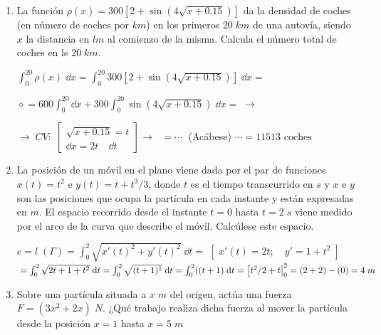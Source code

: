 \begin{enumerate}[{A6} 1. ]

	\item La función $\rho (x)=300 \left[ 2+\sin(4\sqrt{x+0.15}) \right]$ da la densidad de coches (en número de coches por $km$) en los primeros $20\; km$ de una autovía, siendo $x$ la distancia en $lm$ al comienzo de la misma. Calcula el número total de coches en ls $20 \; km$.  
	
	\vspace{3mm}
	
	$\displaystyle \int_0^{20} \rho (x) \; \dd x= \int_0^{20} 300 \left [2+\sin(4\sqrt{x+0.15}) \right]   \; \dd x=$
	
	$\diamond = 600 \int_0^{20} \dd x + 300 \int_0^{20}  \sin (4\sqrt{x+0.15}) \; \dd x = \; \to $
	
	$\to \; CV:\; \left[ \begin{matrix} \sqrt { x+0.15 } =t \\ \dd x=2t\quad \dd t \end{matrix} \right] \to $
	$ \; =\cdots\; $ (\textcolor{gris}{Acábese}) $ \cdots   =11513 \text{ coches } $
	
	
	
	\vspace{5mm}
	
	\item La posición de un móvil en el plano viene dada por el par de funciones $x(t)=t^2$ e $y(t)=t+t^3/3$, donde $t$ es el tiempo transcurrido en $s$ y $x \text{ e } y$ son las posiciones que ocupa la partícula en cada instante y están expresadas en $m$. El espacio recorrido desde el instante $t=0$ hasta $t=2 \; s$ viene medido por el arco de la curva que describe el móvil. Calcúlese este espacio.
	
	\vspace{3mm}
	
	$e=l\; (\Gamma) = \displaystyle \int_0^2 \sqrt{x'(t)^2 + y'(t)^2}\; \dd t=$
	$[\;  x'(t)=2t; \quad y'=1+t^2 \;  ]$
	$\; = \int_0^2 \sqrt{2t+1+t^2}\; \dd t = \int_0^2 \sqrt{(t+1)^1}\; \dd t = \int_0^2 ((t+1)\; \dd t = \eval[t^2/2+t|_0^2= (2+2)-(0)=4\; m$
	
	\vspace{5mm}
	
	\item Sobre una partícula situada a $x\; m$ del origen, actúa una fuerza $F=(3x^2+2x)\; N$. ¿Qué trabajo realiza dicha fuerza al mover la partícula desde la posición $x=1$ hasta $x=5\; m$
	
	\vspace{3mm}
	

\end{enumerate}

